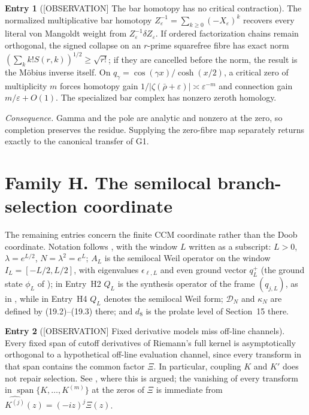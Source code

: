 \documentclass[11pt]{amsart}
\theoremstyle{definition}
\newcounter{family}
\newtheorem{entry}{Entry}[family]
\theoremstyle{remark}
\newcommand{\XiR}{\Xi}
\newcommand{\eps}{\varepsilon}
\newcommand{\OBS}{\textup{[OBSERVATION]}}
\begin{document}
\begin{entry}[\OBS{} The bar homotopy has no critical contraction]
\label{ent:G5}
The normalized multiplicative bar homotopy
\(Z_\eps^{-1}=\sum_{k\ge0}(-X_\eps)^k\) recovers every literal von
Mangoldt weight from \(Z_\eps^{-1}\delta Z_\eps\).  If ordered
factorization chains remain orthogonal, the signed collapse on an
\(r\)-prime squarefree fibre has exact norm
\((\sum_kk!S(r,k))^{1/2}\ge\sqrt{r!}\); if they are cancelled before the
norm, the result is the M\"obius inverse itself.  On
\(q_\gamma=\cos(\gamma x)/\cosh(x/2)\), a critical zero of multiplicity
\(m\) forces homotopy gain \(1/|\zeta(\bar\rho+\eps)|\asymp\eps^{-m}\) and
connection gain \(m/\eps+O(1)\).  The specialized bar complex has nonzero
zeroth homology.
\end{entry}

\emph{Consequence.} Gamma and the pole are analytic and nonzero at the
zero, so completion preserves the residue.  Supplying the zero-fibre map
separately returns exactly to the canonical transfer of G1.

\section{Family H. The semilocal branch-selection coordinate}

The remaining entries concern the finite CCM coordinate rather than the
Doob coordinate.  Notation follows \cite{TrejoPizzo39}, with the window \(L\) written as a subscript: \(L>0\),
\(\lambda=e^{L/2}\), \(N=\lambda^2=e^L\); \(A_L\) is the semilocal Weil
operator on the window \(I_L=[-L/2,L/2]\), with eigenvalues
\(\epsilon_{\ell,L}\) and even ground vector \(q_L^+\) (the ground state \(\phi_L\) of \cite[Section~13]{TrejoPizzo39}); in Entry~H2
\(Q_L\) is the synthesis operator of the frame \((q_{j,L})\), as in
\cite[Theorem~16.1]{TrejoPizzo39}, while in Entry~H4 \(Q_L\) denotes the
semilocal Weil form; \(\mathcal D_N\) and \(\kappa_N\) are defined by
(19.2)--(19.3) there; and \(d_8\) is the prolate level of Section~15
there.

\begin{entry}[\OBS{} Fixed derivative models miss off-line channels]
\label{ent:H1}
Every fixed span of cutoff derivatives of Riemann's full kernel is
asymptotically orthogonal to a hypothetical off-line evaluation channel,
since every transform in that span contains the common factor \(\XiR\).
In particular, coupling \(K\) and \(K'\) does not repair selection.  See
\cite[Section~16]{TrejoPizzo39}, where this is argued; the vanishing of
every transform in \(\operatorname{span}\{K,\dots,K^{(m)}\}\) at the
zeros of \(\XiR\) is immediate from
\(\widehat{K^{(j)}}(z)=(-iz)^j\XiR(z)\).
\end{entry}
\end{document}
